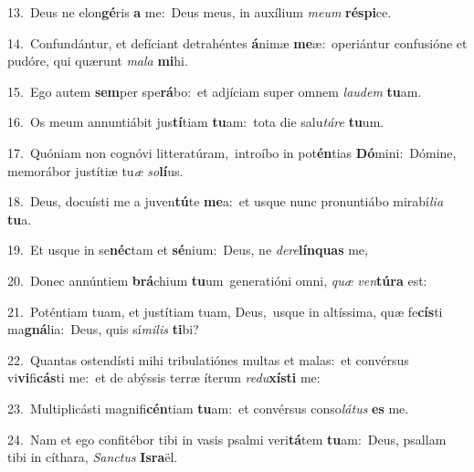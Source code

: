 {\numbfont\textcolor{\numbcolor}{13.}}~Deus ne elon\-\textbf{gé}\-ris \textbf{a} me:~\star Deus meus, in auxílium \textit{me}\-\textit{um} \textbf{ré}\-\textbf{spi}ce.\par
{\numbfont\textcolor{\numbcolor}{14.}}~Confundántur, et defíciant detrahéntes \textbf{á}\-nimæ \textbf{me}\-æ:~\star operiántur confusióne et pudóre, qui quærunt \textit{ma}\-\textit{la} \textbf{mi}\-hi.\par
{\numbfont\textcolor{\numbcolor}{15.}}~Ego autem \textbf{sem}\-per spe\-\textbf{rá}\-bo:~\star et adjíciam super omnem \textit{lau}\-\textit{dem} \textbf{tu}\-am.\par
{\numbfont\textcolor{\numbcolor}{16.}}~Os meum annuntiábit jus\-\textbf{tí}\-tiam \textbf{tu}\-am:~\star tota die salu\-\textit{tá}\-\textit{re} \textbf{tu}\-um.\par
{\numbfont\textcolor{\numbcolor}{17.}}~Quóniam non cognóvi litteratúram,~\dagger introíbo in pot\-\textbf{én}\-tias \textbf{Dó}\-mini:~\star Dómine, memorábor justítiæ tu\textit{æ} \textit{so}\-\textbf{lí}us.\par
{\numbfont\textcolor{\numbcolor}{18.}}~Deus, docuísti me a juven\-\textbf{tú}\-te \textbf{me}\-a:~\star et usque nunc pronuntiábo mirabí\-\textit{li}\-\textit{a} \textbf{tu}\-a.\par
{\numbfont\textcolor{\numbcolor}{19.}}~Et usque in se\-\textbf{néc}\-tam et \textbf{sé}\-nium:~\star Deus, ne \textit{de}\-\textit{re}\textbf{lín}\textbf{quas} me,\par
{\numbfont\textcolor{\numbcolor}{20.}}~Donec annúntiem \textbf{brá}\-chium \textbf{tu}\-um~\star generatióni omni, \textit{quæ} \textit{ven}\-\textbf{tú}\textbf{ra} est:\par
{\numbfont\textcolor{\numbcolor}{21.}}~Poténtiam tuam, et justítiam tuam, Deus,~\dagger usque in altíssima, quæ fe\-\textbf{cís}\-ti ma\-\textbf{gná}\-lia:~\star Deus, quis sí\-\textit{mi}\-\textit{lis} \textbf{ti}\-bi?\par
{\numbfont\textcolor{\numbcolor}{22.}}~Quantas ostendísti mihi tribulatiónes multas et malas:~\dagger et convérsus vi\-\textbf{vi}\-fi\-\textbf{cás}\-ti me:~\star et de abýssis terræ íterum \textit{re}\-\textit{du}\textbf{xís}\textbf{ti} me:\par
{\numbfont\textcolor{\numbcolor}{23.}}~Multiplicásti magnifi\-\textbf{cén}\-tiam \textbf{tu}\-am:~\star et convérsus conso\-\textit{lá}\-\textit{tus} \textbf{es} me.\par
{\numbfont\textcolor{\numbcolor}{24.}}~Nam et ego confitébor tibi in vasis psalmi veri\-\textbf{tá}\-tem \textbf{tu}\-am:~\star Deus, psallam tibi in cíthara, \textit{Sanc}\-\textit{tus} \textbf{Is}\-\textbf{ra}ël.\par
